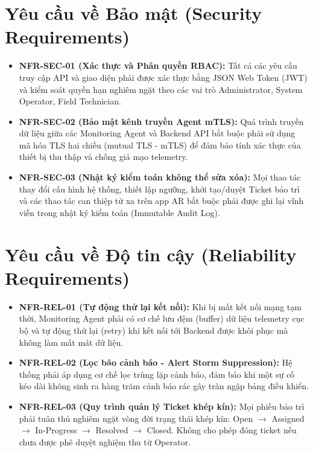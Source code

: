 \section{Yêu cầu về Bảo mật (Security Requirements)}
\begin{itemize}
    \item \textbf{NFR-SEC-01 (Xác thực và Phân quyền RBAC):} Tất cả các yêu cầu truy cập API và giao diện phải được xác thực bằng JSON Web Token (JWT) và kiểm soát quyền hạn nghiêm ngặt theo các vai trò Administrator, System Operator, Field Technician.
    \item \textbf{NFR-SEC-02 (Bảo mật kênh truyền Agent mTLS):} Quá trình truyền dữ liệu giữa các Monitoring Agent và Backend API bắt buộc phải sử dụng mã hóa TLS hai chiều (mutual TLS - mTLS) để đảm bảo tính xác thực của thiết bị thu thập và chống giả mạo telemetry.
    \item \textbf{NFR-SEC-03 (Nhật ký kiểm toán không thể sửa xóa):} Mọi thao tác thay đổi cấu hình hệ thống, thiết lập ngưỡng, khởi tạo/duyệt Ticket bảo trì và các thao tác can thiệp từ xa trên app AR bắt buộc phải được ghi lại vĩnh viễn trong nhật ký kiểm toán (Immutable Audit Log).
\end{itemize}

\section{Yêu cầu về Độ tin cậy (Reliability Requirements)}
\begin{itemize}
    \item \textbf{NFR-REL-01 (Tự động thử lại kết nối):} Khi bị mất kết nối mạng tạm thời, Monitoring Agent phải có cơ chế lưu đệm (buffer) dữ liệu telemetry cục bộ và tự động thử lại (retry) khi kết nối tới Backend được khôi phục mà không làm mất mát dữ liệu.
    \item \textbf{NFR-REL-02 (Lọc bão cảnh báo - Alert Storm Suppression):} Hệ thống phải áp dụng cơ chế lọc trùng lặp cảnh báo, đảm bảo khi một sự cố kéo dài không sinh ra hàng trăm cảnh báo rác gây tràn ngập bảng điều khiển.
    \item \textbf{NFR-REL-03 (Quy trình quản lý Ticket khép kín):} Mọi phiếu bảo trì phải tuân thủ nghiêm ngặt vòng đời trạng thái khép kín: Open $\rightarrow$ Assigned $\rightarrow$ In-Progress $\rightarrow$ Resolved $\rightarrow$ Closed. Không cho phép đóng ticket nếu chưa được phê duyệt nghiệm thu từ Operator.
\end{itemize}

